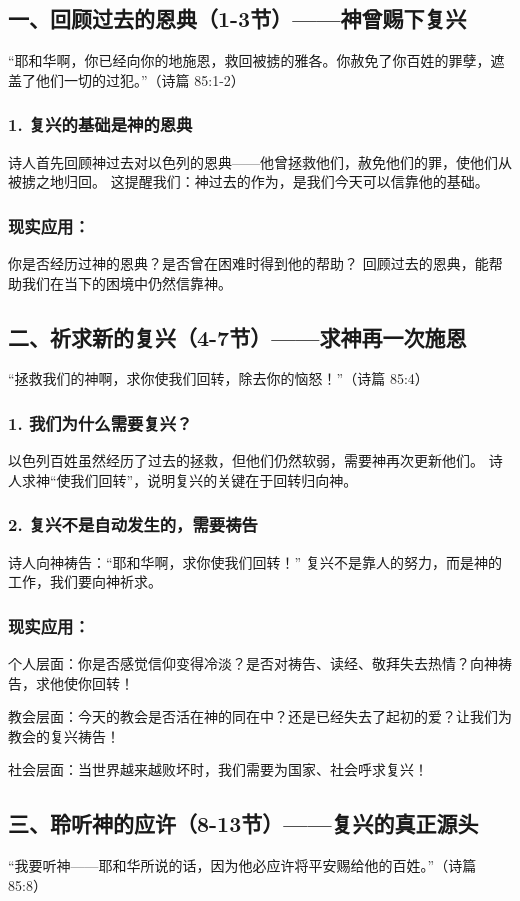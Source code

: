 \documentclass[a4paper, 12pt]{article}
\begin{document}
\subsection*{一、回顾过去的恩典（1-3节）——神曾赐下复兴}
“耶和华啊，你已经向你的地施恩，救回被掳的雅各。你赦免了你百姓的罪孽，遮盖了他们一切的过犯。”（诗篇 85:1-2）

\subsubsection*{1. 复兴的基础是神的恩典}
诗人首先回顾神过去对以色列的恩典——他曾拯救他们，赦免他们的罪，使他们从被掳之地归回。
这提醒我们：神过去的作为，是我们今天可以信靠他的基础。
\subsubsection*{现实应用：}

你是否经历过神的恩典？是否曾在困难时得到他的帮助？
回顾过去的恩典，能帮助我们在当下的困境中仍然信靠神。
\subsection*{二、祈求新的复兴（4-7节）——求神再一次施恩}
“拯救我们的神啊，求你使我们回转，除去你的恼怒！”（诗篇 85:4）

\subsubsection*{1. 我们为什么需要复兴？}
以色列百姓虽然经历了过去的拯救，但他们仍然软弱，需要神再次更新他们。
诗人求神“使我们回转”，说明复兴的关键在于回转归向神。
\subsubsection*{2. 复兴不是自动发生的，需要祷告}
诗人向神祷告：“耶和华啊，求你使我们回转！”
复兴不是靠人的努力，而是神的工作，我们要向神祈求。
\subsubsection*{现实应用：}
\hspace{0.6cm}个人层面：你是否感觉信仰变得冷淡？是否对祷告、读经、敬拜失去热情？向神祷告，求他使你回转！

教会层面：今天的教会是否活在神的同在中？还是已经失去了起初的爱？让我们为教会的复兴祷告！

社会层面：当世界越来越败坏时，我们需要为国家、社会呼求复兴！
\subsection*{三、聆听神的应许（8-13节）——复兴的真正源头}
“我要听神——耶和华所说的话，因为他必应许将平安赐给他的百姓。”（诗篇 85:8）
\end{document}
